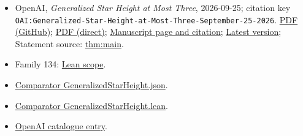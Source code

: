 \documentclass[11pt]{article}
\begin{document}
\begin{itemize}
\item OpenAI, \emph{Generalized Star Height at Most Three}, 2026-09-25; citation key \texttt{OAI:Generalized-Star-Height-at-Most-Three-September-25-2026}. \href{https://github.com/openai/math/blob/adc7f1241b42e322a6451854ab7e4b4c146bf78a/preprints/Generalized-Star-Height-at-Most-Three-September-25-2026/article.pdf}{PDF (GitHub)}; \href{https://github.com/openai/math/raw/adc7f1241b42e322a6451854ab7e4b4c146bf78a/preprints/Generalized-Star-Height-at-Most-Three-September-25-2026/article.pdf}{PDF (direct)}; \href{https://github.com/openai/math/blob/adc7f1241b42e322a6451854ab7e4b4c146bf78a/preprints/Generalized-Star-Height-at-Most-Three-September-25-2026/README.md}{Manuscript page and citation}; \href{https://github.com/openai/math/blob/main/preprints/Generalized-Star-Height-at-Most-Three-September-25-2026/article.pdf}{Latest version}; Statement source: \href{https://github.com/openai/math/blob/adc7f1241b42e322a6451854ab7e4b4c146bf78a/preprints/Generalized-Star-Height-at-Most-Three-September-25-2026/build/sections/introduction.tex\#L29}{thm:main}.
\item Family 134: \href{https://github.com/openai/math/blob/adc7f1241b42e322a6451854ab7e4b4c146bf78a/lean/docs/134.md}{Lean scope}.
\item \href{https://github.com/openai/math/blob/adc7f1241b42e322a6451854ab7e4b4c146bf78a/lean/ComparatorChallenges/GeneralizedStarHeight.json}{Comparator GeneralizedStarHeight.json}.
\item \href{https://github.com/openai/math/blob/adc7f1241b42e322a6451854ab7e4b4c146bf78a/lean/ComparatorChallenges/GeneralizedStarHeight.lean}{Comparator GeneralizedStarHeight.lean}.
\item \href{https://github.com/openai/math/blob/adc7f1241b42e322a6451854ab7e4b4c146bf78a/CONTENTS.md}{OpenAI catalogue entry}.
\end{itemize}
\end{document}
